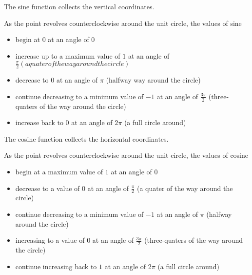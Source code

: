 \documentclass{ximera}
\begin{document}
The sine function collects the vertical coordinates.


\begin{center}
\end{center}

As the point revolves counterclockwise around the unit circle, the values of sine 

\begin{itemize}
\item begin at $0$ at an angle of $0$
\item increase up to a maximum value of $1$ at an angle of $\frac{\pi}{2} (a quater of the way around the circle)$
\item decrease to $0$ at an angle of $\pi$ (halfway way around the circle)
\item continue decreasing to a minimum value of $-1$ at an angle of $\frac{3 \pi}{2}$ (three-quaters of the way around the circle)
\item increase back to $0$ at an angle of $2 \pi$ (a full circle around)
\end{itemize}










The cosine function collects the horizontal coordinates.

\begin{center}
\end{center}

As the point revolves counterclockwise around the unit circle, the values of cosine 

\begin{itemize}
\item begin at a maximum value of $1$ at an angle of $0$
\item decrease to a value of $0$ at an angle of $\frac{\pi}{2}$ (a quater of the way around the circle)
\item continue decreasing to a minimum value of $-1$ at an angle of $\pi$ (halfway around the circle)
\item increasing to a value of $0$ at an angle of $\frac{3 \pi}{2}$ (three-quaters of the way around the circle)
\item continue increasing back to $1$ at an angle of $2 \pi$ (a full circle around)
\end{itemize}
\end{document}
